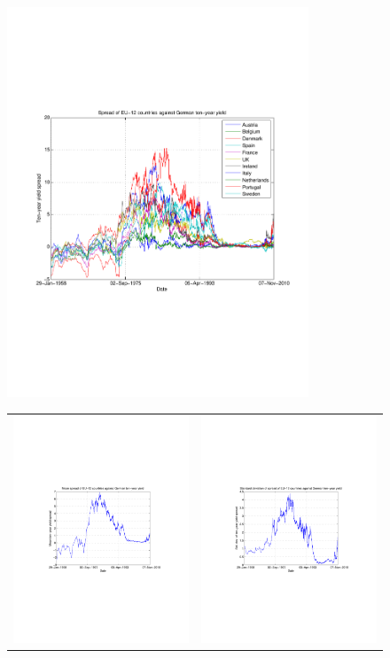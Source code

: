 \documentclass[3p]{elsarticle}
\begin{document}
\begin{figure}[ht!]
	\centering
	\includegraphics[width=9cm]{fig_de_spread_eu12}
	\begin{tabular}{cc}
		\includegraphics[width=7cm]{fig_de_meanspread_eu12} & \includegraphics[width=7cm]{fig_de_stdspread_eu12}\\

\end{tabular}
\end{figure}
\end{document}
